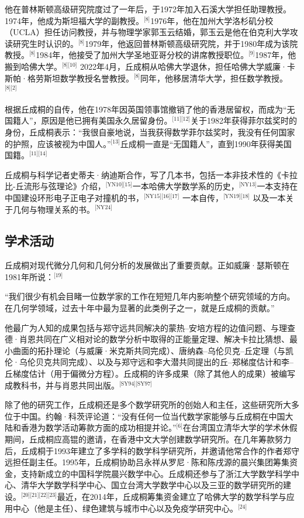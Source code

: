他在普林斯顿高级研究院度过了一年后，于1972年加入石溪大学担任助理教授。1974年，他成为斯坦福大学的副教授。\(^\text{[8]}\)1976年，他在加州大学洛杉矶分校（UCLA）担任访问教授，并与物理学家郭玉云结婚，郭玉云是他在伯克利大学攻读研究生时认识的。\(^\text{[8]}\)1979年，他返回普林斯顿高级研究院，并于1980年成为该院教授。\(^\text{[8]}\)1984年，他接受了加州大学圣地亚哥分校的讲席教授职位。\(^\text{[9]}\)1987年，他搬到哈佛大学。\(^\text{[8][10]}\) 2022年4月，丘成桐从哈佛大学退休，担任哈佛大学威廉·卡斯帕·格劳斯坦数学教授名誉教授。\(^\text{[8]}\)同年，他移居清华大学，担任数学教授。\(^\text{[8][2]}\)

根据丘成桐的自传，他在1978年因英国领事馆撤销了他的香港居留权，而成为“无国籍人”，原因是他已拥有美国永久居留身份。\(^\text{[11][12]}\)关于1982年获得菲尔兹奖时的身份，丘成桐表示：“我很自豪地说，当我获得数学菲尔兹奖时，我没有任何国家的护照，应该被视为中国人。”\(^\text{[13]}\)丘成桐一直是“无国籍人”，直到1990年获得美国国籍。\(^\text{[11][14]}\)

丘成桐与科学记者史蒂夫·纳迪斯合作，写了几本书，包括一本非技术性的《卡拉比-丘流形与弦理论》介绍，\(^\text{[YN10][15]}\)一本哈佛大学数学系的历史，\(^\text{[NY13]}\)一本支持在中国建设环形电子正电子对撞机的书，\(^\text{[NY15][16][17]}\) 一本自传，\(^\text{[YN19][18]}\) 以及一本关于几何与物理关系的书。\(^\text{[NY24]}\)
\subsection{学术活动}  
丘成桐对现代微分几何和几何分析的发展做出了重要贡献。正如威廉·瑟斯顿在1981年所说：\(^\text{[19]}\)

“我们很少有机会目睹一位数学家的工作在短短几年内影响整个研究领域的方向。在几何学领域，过去十年中最为显著的此类例子之一，就是丘成桐的贡献。”

他最广为人知的成果包括与郑守远共同解决的蒙热–安培方程的边值问题、与理查德·肖恩共同在广义相对论的数学分析中取得的正能量定理、解决卡拉比猜想、最小曲面的拓扑理论（与威廉·米克斯共同完成）、唐纳森–乌伦贝克–丘定理（与凯伦·乌伦贝克共同完成）、以及与郑守远和李大潜共同提出的丘–郑梯度估计和李–丘梯度估计（用于偏微分方程）。丘成桐的许多成果（除了其他人的成果）被编写成教科书，并与肖恩共同出版。\(^\text{[SY94][SY97]}\)

除了他的研究工作，丘成桐还是多个数学研究所的创始人和主任，这些研究所大多位于中国。约翰·科茨评论道：“没有任何一位当代数学家能够与丘成桐在中国大陆和香港为数学活动筹款方面的成功相提并论。”\(^\text{[6]}\)在台湾国立清华大学的学术休假期间，丘成桐应高锟的邀请，在香港中文大学创建数学研究所。在几年筹款努力后，丘成桐于1993年建立了多学科的数学科学研究所，并邀请他常合作的作者郑守远担任副主任。1995年，丘成桐协助吕永祥从罗尼·陈和陈戌源的晨兴集团筹集资金，支持新成立的中国科学院晨兴数学中心。丘成桐还参与了浙江大学数学科学中心、清华大学数学科学中心、国立台湾大学数学中心以及三亚的数学研究所的建设。\(^\text{[20][21][22][23]}\)最近，在2014年，丘成桐筹集资金建立了哈佛大学的数学科学与应用中心（他是主任）、绿色建筑与城市中心以及免疫学研究中心。\(^\text{[24]}\)

